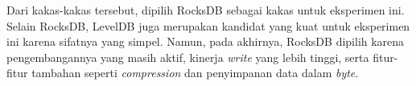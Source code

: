 Dari kakas-kakas tersebut, dipilih RocksDB sebagai kakas untuk eksperimen ini. Selain RocksDB, LevelDB juga merupakan kandidat yang kuat untuk eksperimen ini karena sifatnya yang simpel. Namun, pada akhirnya, RocksDB dipilih karena pengembangannya yang masih aktif, kinerja \textit{write} yang lebih tinggi, serta fitur-fitur tambahan seperti \textit{compression} dan penyimpanan data dalam \textit{byte}.